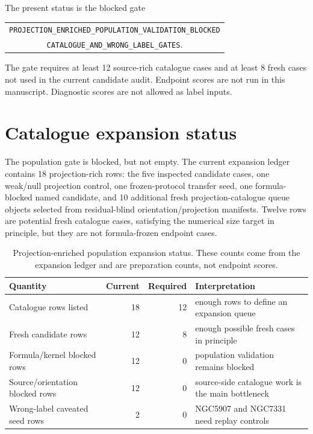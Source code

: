 \documentclass[11pt]{article}
\begin{document}
The present status is the blocked gate
\begin{center}
\small
\begin{tabular}{c}
\texttt{PROJECTION\_ENRICHED\_POPULATION\_VALIDATION\_BLOCKED}\\
\texttt{CATALOGUE\_AND\_WRONG\_LABEL\_GATES}.
\end{tabular}
\end{center}
The gate requires at least 12 source-rich catalogue cases and at least 8 fresh
cases not used in the current candidate audit.  Endpoint scores are not run
in this manuscript.  Diagnostic scores are not allowed as label inputs.

\section{Catalogue expansion status}
\label{sec:catalogue-expansion}

The population gate is blocked, but not empty.  The current expansion ledger
contains 18 projection-rich rows: the five inspected candidate cases, one
weak/null projection control, one frozen-protocol transfer seed, one
formula-blocked named candidate, and 10 additional fresh projection-catalogue
queue objects selected from residual-blind orientation/projection manifests.
Twelve rows are potential fresh catalogue cases, satisfying the numerical size
target in principle, but they are not formula-frozen endpoint cases.

\begin{table}[H]
\centering
\small
\begin{tabularx}{\linewidth}{lrrX}
\toprule
Quantity & Current & Required & Interpretation \\
\midrule
Catalogue rows listed & 18 & 12 & enough rows to define an expansion queue \\
Fresh candidate rows & 12 & 8 & enough possible fresh cases in principle \\
Formula/kernel blocked rows & 12 & 0 & population validation remains blocked \\
Source/orientation blocked rows & 12 & 0 & source-side catalogue work is the main bottleneck \\
Wrong-label caveated seed rows & 2 & 0 & NGC5907 and NGC7331 need replay controls \\
\bottomrule
\end{tabularx}
\caption{Projection-enriched population expansion status.  These counts come
from the expansion ledger and are preparation counts, not endpoint scores.}
\label{tab:projection-expansion-status}
\end{table}
\end{document}
